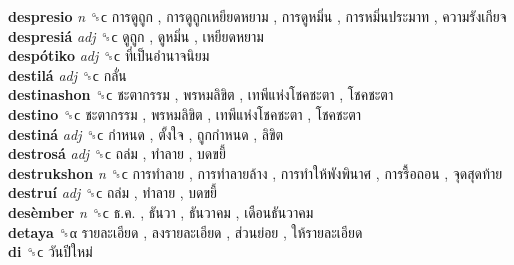 \textbf{despresio} \emph{n}  ␝ϲ   การดูถูก ,  การดูถูกเหยียดหยาม ,  การดูหมิ่น ,  การหมิ่นประมาท ,  ความรังเกียจ   \\
\textbf{despresiá} \emph{adj}  ␝ϲ   ดูถูก ,  ดูหมิ่น ,  เหยียดหยาม   \\
\textbf{despótiko} \emph{adj}  ␝ϲ   ที่เป็นอำนาจนิยม   \\
\textbf{destilá} \emph{adj}  ␝ϲ   กลั่น   \\
\textbf{destinashon} ␝ϲ   ชะตากรรม ,  พรหมลิขิต ,  เทพีแห่งโชคชะตา ,  โชคชะตา   \\
\textbf{destino} ␝ϲ   ชะตากรรม ,  พรหมลิขิต ,  เทพีแห่งโชคชะตา ,  โชคชะตา   \\
\textbf{destiná} \emph{adj}  ␝ϲ   กำหนด ,  ตั้งใจ ,  ถูกกำหนด ,  ลิขิต   \\
\textbf{destrosá} \emph{adj}  ␝ϲ   ถล่ม ,  ทำลาย ,  บดขยี้   \\
\textbf{destrukshon} \emph{n}  ␝ϲ   การทำลาย ,  การทำลายล้าง ,  การทำให้พังพินาศ ,  การรื้อถอน ,  จุดสุดท้าย   \\
\textbf{destruí} \emph{adj}  ␝ϲ   ถล่ม ,  ทำลาย ,  บดขยี้   \\
\textbf{desèmber} \emph{n}  ␝ϲ   ธ.ค. ,  ธันวา ,  ธันวาคม ,  เดือนธันวาคม   \\
\textbf{detaya} ␝α   รายละเอียด ,  ลงรายละเอียด ,  ส่วนย่อย ,  ให้รายละเอียด   \\
\textbf{di} ␝ϲ   วันปีใหม่   \\
